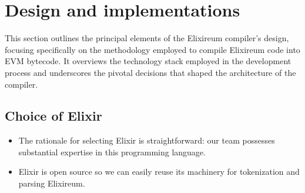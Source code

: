 \section{Design and implementations}
\label{sec:design}

This section outlines the principal elements of the Elixireum compiler's design, focusing specifically on the methodology employed to compile Elixireum code into EVM bytecode. It overviews the technology stack employed in the development process and underscores the pivotal decisions that shaped the architecture of the compiler.


\subsection{Choice of Elixir}
\begin{itemize}
    \item The rationale for selecting Elixir is straightforward: our team possesses substantial expertise in this programming language.
    \item Elixir is open source so we can easily reuse its machinery for tokenization and parsing Elixireum.
\end{itemize}

